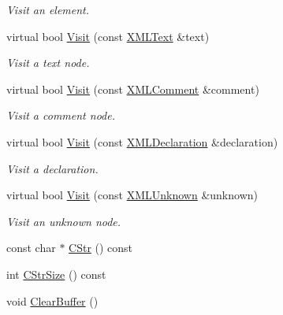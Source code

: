 \begin{DoxyCompactItemize}
\begin{DoxyCompactList}\small\item\em Visit an element. \end{DoxyCompactList}\item 
\mbox{\label{classtinyxml2_1_1_x_m_l_printer_adc0e42b4f6fcb90a95630c79575d030b}} 
virtual bool \mbox{\hyperlink{classtinyxml2_1_1_x_m_l_printer_adc0e42b4f6fcb90a95630c79575d030b}{Visit}} (const \mbox{\hyperlink{classtinyxml2_1_1_x_m_l_text}{X\+M\+L\+Text}} \&text)
\begin{DoxyCompactList}\small\item\em Visit a text node. \end{DoxyCompactList}\item 
\mbox{\label{classtinyxml2_1_1_x_m_l_printer_aa294c5c01af0ebb9114902456e4cb53c}} 
virtual bool \mbox{\hyperlink{classtinyxml2_1_1_x_m_l_printer_aa294c5c01af0ebb9114902456e4cb53c}{Visit}} (const \mbox{\hyperlink{classtinyxml2_1_1_x_m_l_comment}{X\+M\+L\+Comment}} \&comment)
\begin{DoxyCompactList}\small\item\em Visit a comment node. \end{DoxyCompactList}\item 
\mbox{\label{classtinyxml2_1_1_x_m_l_printer_acfc625b2549304b9c7eb85ebd5c5eb39}} 
virtual bool \mbox{\hyperlink{classtinyxml2_1_1_x_m_l_printer_acfc625b2549304b9c7eb85ebd5c5eb39}{Visit}} (const \mbox{\hyperlink{classtinyxml2_1_1_x_m_l_declaration}{X\+M\+L\+Declaration}} \&declaration)
\begin{DoxyCompactList}\small\item\em Visit a declaration. \end{DoxyCompactList}\item 
\mbox{\label{classtinyxml2_1_1_x_m_l_printer_ab8af5455bbf9e4be2663e6642fcd7e32}} 
virtual bool \mbox{\hyperlink{classtinyxml2_1_1_x_m_l_printer_ab8af5455bbf9e4be2663e6642fcd7e32}{Visit}} (const \mbox{\hyperlink{classtinyxml2_1_1_x_m_l_unknown}{X\+M\+L\+Unknown}} \&unknown)
\begin{DoxyCompactList}\small\item\em Visit an unknown node. \end{DoxyCompactList}\item 
const char $\ast$ \mbox{\hyperlink{classtinyxml2_1_1_x_m_l_printer_a180671d73844f159f2d4aafbc11d106e}{C\+Str}} () const
\item 
int \mbox{\hyperlink{classtinyxml2_1_1_x_m_l_printer_a3256cf3523d4898b91abb18b924be04c}{C\+Str\+Size}} () const
\item 
void \mbox{\hyperlink{classtinyxml2_1_1_x_m_l_printer_a216157765b7267bf389975b1cbf9a909}{Clear\+Buffer}} ()
\end{DoxyCompactItemize}
